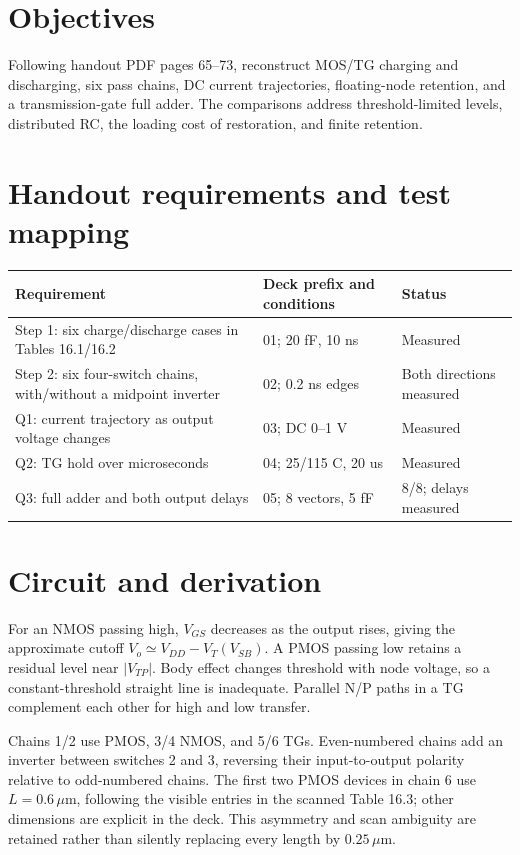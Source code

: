 \section{Objectives}

Following handout PDF pages 65--73, reconstruct MOS/TG charging and discharging, six pass chains, DC current trajectories, floating-node retention, and a transmission-gate full adder. The comparisons address threshold-limited levels, distributed RC, the loading cost of restoration, and finite retention.

\section{Handout requirements and test mapping}

\begin{center}
\small
\setlength{\tabcolsep}{4pt}
\begin{tabular}{p{.42\linewidth}p{.29\linewidth}p{.18\linewidth}}
\toprule
Requirement & Deck prefix and conditions & Status \\
\midrule
Step 1: six charge/discharge cases in Tables 16.1/16.2 & 01; 20 fF, 10 ns & Measured \\
Step 2: six four-switch chains, with/without a midpoint inverter & 02; 0.2 ns edges & Both directions measured \\
Q1: current trajectory as output voltage changes & 03; DC 0--1 V & Measured \\
Q2: TG hold over microseconds & 04; 25/115 C, 20 us & Measured \\
Q3: full adder and both output delays & 05; 8 vectors, 5 fF & 8/8; delays measured \\
\bottomrule
\end{tabular}
\end{center}

\section{Circuit and derivation}

For an NMOS passing high, $V_{GS}$ decreases as the output rises, giving the approximate cutoff $V_o\simeq V_{DD}-V_T(V_{SB})$. A PMOS passing low retains a residual level near $|V_{TP}|$. Body effect changes threshold with node voltage, so a constant-threshold straight line is inadequate. Parallel N/P paths in a TG complement each other for high and low transfer.

Chains 1/2 use PMOS, 3/4 NMOS, and 5/6 TGs. Even-numbered chains add an inverter between switches 2 and 3, reversing their input-to-output polarity relative to odd-numbered chains. The first two PMOS devices in chain 6 use $L=0.6\,\mu$m, following the visible entries in the scanned Table 16.3; other dimensions are explicit in the deck. This asymmetry and scan ambiguity are retained rather than silently replacing every length by $0.25\,\mu$m.

